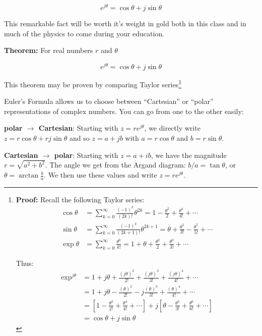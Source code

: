 \documentclass{tufte-book}
\begin{document}
\begin{equation}\label{eq:eulers}
e^{j\theta} = \cos\theta + j\sin\theta
\end{equation}

This remarkable fact will be worth it's weight in gold both in this class and in much of the physics to come during your education. 


\textbf{Theorem:} For real numbers $r$ and $\theta$

$$
e^{j\theta} = \cos\theta + j\sin\theta
$$

This theorem may be proven by comparing Taylor series\footnote
{
\textbf{Proof:} Recall the following Taylor series:
\begin{align*}
\cos\theta  &= \sum_{k=0}^\infty\frac{\left(-1\right)^k}{\left(2k\right)!}\theta^{2k} = 1 - \frac{\theta^2}{2} + \frac{\theta^4}{4!} + \cdots \\
\sin\theta  &= \sum_{k=0}^\infty\frac{\left(-1\right)^k}{\left(2k+1\right)!}\theta^{2k+1} = \theta + \frac{\theta^3}{3!} - \frac{\theta^5}{5!} + \cdots \\
\exp{\theta} &= \sum_{k=0}^\infty \frac{\theta^k}{k!} = 1 + \theta + \frac{\theta^2}{2} + \frac{\theta^3}{3!} + \cdots
\end{align*}

Thus:
\begin{align*}
\exp^{j\theta} &= 1 + j\theta + \frac{\left(j\theta\right)^2}{2!} +  \frac{\left(j\theta\right)^3}{3!} +  \frac{\left(j\theta\right)^4}{4!} + \cdots \\
&= 1 + j\theta - \frac{\left(\theta\right)^2}{2!} -  j\frac{\left(\theta\right)^3}{3!} + \frac{\left(\theta\right)^4}{4!} + \cdots \\
&= \left[1-\frac{\theta^2}{2!}+\frac{\theta^4}{4!} +\cdots\right] + j\left[\theta -\frac{\theta^3}{3!} + \frac{\theta^6}{6!} + \cdots\right] \\
&= \cos\theta + j\sin\theta 
\end{align*}
}

\noindent Euler's Formula allows us to choose between ``Cartesian'' or ``polar'' representations of complex numbers. You can go from one to the other easily:

\noindent\textbf{polar $\rightarrow$ Cartesian}: Starting with $z = re^{j\theta}$, we directly write $z = r\cos\theta + rj\sin\theta$ and so $z = a + jb$ with $a = r\cos\theta$ and $b = r\sin\theta$.

\noindent\textbf{Cartesian $\rightarrow$ polar}: Starting with $z = a+ib$, we have the magnitude $r = \sqrt{a^2+b^2}$. The angle we get from the Argand diagram: $b/a = \tan\theta$, or $\theta = \arctan\frac{b}{a}$. We then use these values and write $z = re^{j\theta}$.
\end{document}
